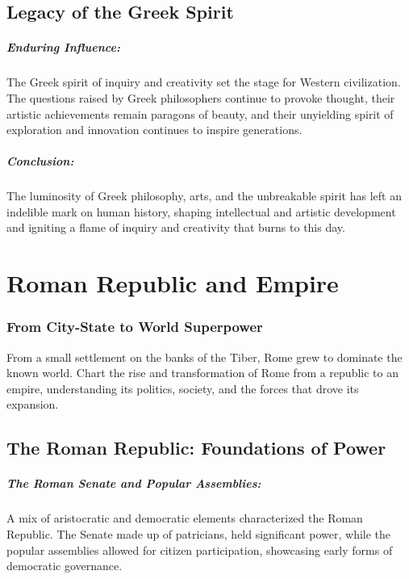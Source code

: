 \documentclass[a4paper,12pt]{book}
\begin{document}
\section*{Legacy of the Greek Spirit}

\paragraph{Enduring Influence:}
The Greek spirit of inquiry and creativity set the stage for Western civilization. The questions raised by Greek philosophers continue to provoke thought, their artistic achievements remain paragons of beauty, and their unyielding spirit of exploration and innovation continues to inspire generations.

\paragraph{Conclusion:}
The luminosity of Greek philosophy, arts, and the unbreakable spirit has left an indelible mark on human history, shaping intellectual and artistic development and igniting a flame of inquiry and creativity that burns to this day.

\chapter{Roman Republic and Empire}
\subsection*{From City-State to World Superpower}
From a small settlement on the banks of the Tiber, Rome grew to dominate the known world. Chart the rise and transformation of Rome from a republic to an empire, understanding its politics, society, and the forces that drove its expansion.

\section*{The Roman Republic: Foundations of Power}

\paragraph{The Roman Senate and Popular Assemblies:}
A mix of aristocratic and democratic elements characterized the Roman Republic. The Senate made up of patricians, held significant power, while the popular assemblies allowed for citizen participation, showcasing early forms of democratic governance.
\end{document}
